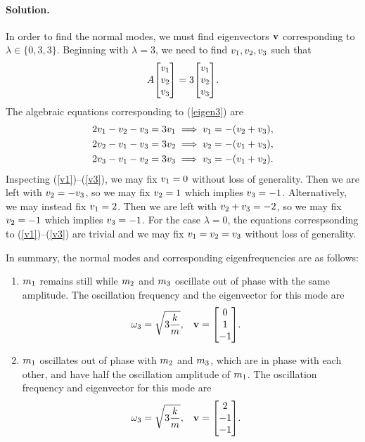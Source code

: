 \documentclass[11pt]{article}
\newcommand{\refeq}[1]{(\ref{#1})}
\newenvironment{solution}
{
    \paragraph{Solution.}
    \ignorespaces
}
{
    \bigskip
}
\begin{document}
\begin{solution}
	In order to find the normal modes, we must find eigenvectors $\mathbf{v}$ corresponding to $\lambda \in \{ 0, 3, 3 \}$.  Beginning with $\lambda = 3$, we need to find $v_1, v_2, v_3$ such that
	\begin{equation} \label{eigen3}
		A \mqty[ \vq \\ \vw \\ \ve ] = 3 \mqty[ \vq \\ \vw \\ \ve ].
	\end{equation}
	The algebraic equations corresponding to \refeq{eigen3} are
	\begin{align}
		2 v_1 - v_2 - v_3 = 3 v_1 &\implies v_1 = -(v_2 + v_3), \label{v1} \\
		2 v_2 - v_1 - v_3 = 3 v_2 &\implies v_2 = -(v_1 + v_3), \label{v2} \\
		2 v_3 - v_1 - v_2 = 3 v_3 &\implies v_3 = -(v_1 + v_2). \label{v3}
	\end{align}
	Inspecting \refeq{v1}--\refeq{v3}, we may fix $v_1 = 0$ without loss of generality.  Then we are left with $v_2 = -v_3$, so we may fix $v_2 = 1$ which implies $v_3 = -1$.  Alternatively, we may instead fix $v_1 = 2$.  Then we are left with $v_2 + v_3 = -2$, so we may fix $v_2 = -1$ which implies $v_3 = -1$.  For the case $\lambda = 0$, the equations correspsonding to \refeq{v1}--\refeq{v3} are trivial and we may fix $v_1 = v_2 = v_3$ without loss of generality.
	
	In summary, the normal modes and corresponding eigenfrequencies are as follows:
	\renewcommand{\theenumi}{\alph{enumi}}
	\begin{enumerate}
		\item $m_1$ remains still while $m_2$ and $m_3$ oscillate out of phase with the same amplitude.  The oscillation frequency and the eigenvector for this mode are
			\begin{align}
				\ome &= \sqrt{3 \frac{k}{m}}, & \vv &= \mqty[0 \\ 1 \\ -1].
			\end{align}
		
		\item $m_1$ oscillates out of phase with $m_2$ and $m_3$, which are in phase with each other, and have half the oscillation amplitude of $m_1$.  The oscillation frequency and eigenvector for this mode are
			\begin{align}
				\ome &= \sqrt{3 \frac{k}{m}}, & \vv &= \mqty[2 \\ -1 \\ -1].
			\end{align}
			

\end{enumerate}
\end{solution}
\end{document}

